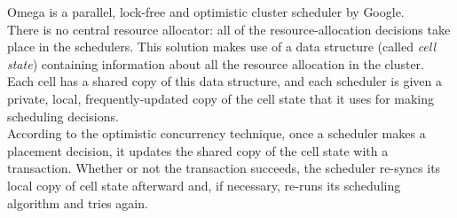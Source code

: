 Omega \cite{omega} is a parallel, lock-free and optimistic cluster scheduler by Google.\\
There is no central resource allocator: all of the resource-allocation decisions take place in the schedulers. This solution makes use of a data structure (called \textit{cell state}) containing information about all the resource allocation in the cluster. Each cell has a shared copy of this data structure, and each scheduler is given a private, local, frequently-updated copy of the cell state that it uses for making scheduling decisions.\\
According to the optimistic concurrency technique, once a scheduler makes a placement decision, it updates the shared copy of the cell state with a transaction. Whether or not the transaction succeeds, the scheduler re-syncs its local copy of cell state afterward and, if necessary, re-runs its scheduling algorithm and tries again.